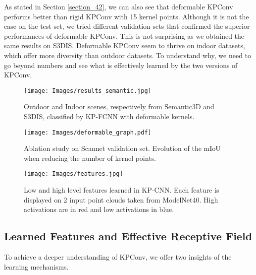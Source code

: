 \documentclass[10pt,twocolumn,letterpaper]{article}
\begin{document}
As stated in Section \ref{section_42}, we can also see that deformable KPConv performs better than rigid KPConv with 15 kernel points. Although it is not the case on the test set, we tried different validation sets that confirmed the superior performances of deformable KPConv. This is not surprising as we obtained the same results on S3DIS. Deformable KPConv seem to thrive on indoor datasets, which offer more diversity than outdoor datasets. To understand why, we need to go beyond numbers and see what is effectively learned by the two versions of KPConv. 

\begin{figure}[t]
    \centering
    \texttt{[image: Images/results\_semantic.jpg]}
    \caption{Outdoor and Indoor scenes, respectively from Semantic3D and S3DIS, classified by KP-FCNN with deformable kernels.}
    \label{fig_results}
    \vspace{-3ex}
\end{figure}

\begin{figure}[b]
    \vspace{-3ex}
    \centering
    \texttt{[image: Images/deformable\_graph.pdf]}
    \caption{Ablation study on Scannet validation set. Evolution of the mIoU when reducing the number of kernel points.}
    \label{fig_ablation}
\end{figure}

\begin{figure}[t!]
    \centering
    \texttt{[image: Images/features.jpg]}
    \caption{Low and high level features learned in KP-CNN. Each feature is displayed on 2 input point clouds taken from ModelNet40. High activations are in red and low activations in blue.}
    \label{fig_features}
    \vspace{-3ex}
\end{figure}


\subsection{Learned Features and Effective Receptive Field}

To achieve a deeper understanding of KPConv, we offer two insights of the learning mechanisms. 
\end{document}
